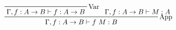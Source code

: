 \documentclass{article}
\begin{document}
$$\prftree[r]{App}{\prftree[r]{Var}{\Gamma, f : A \to B \vdash f : A \to B}}{\Gamma, f : A \to B \vdash M : A}{\Gamma, f : A \to B \vdash f\ M : B}$$
\end{document}

